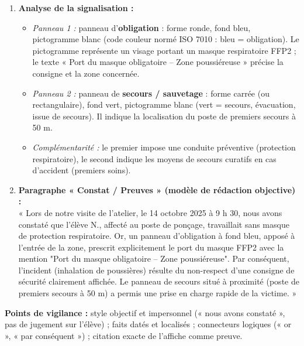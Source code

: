 \documentclass[11pt]{article}
\begin{document}
\begin{corrige}
\begin{enumerate}
    \item \textbf{Analyse de la signalisation :}
    \begin{itemize}
        \item \emph{Panneau 1 :} panneau d'\textbf{obligation} : forme ronde, fond bleu, pictogramme blanc (code couleur normé ISO 7010 : bleu = obligation). Le pictogramme représente un visage portant un masque respiratoire FFP2 ; le texte « Port du masque obligatoire – Zone poussiéreuse » précise la consigne et la zone concernée.
        \item \emph{Panneau 2 :} panneau de \textbf{secours / sauvetage} : forme carrée (ou rectangulaire), fond vert, pictogramme blanc (vert = secours, évacuation, issue de secours). Il indique la localisation du poste de premiers secours à 50 m.
        \item \emph{Complémentarité :} le premier impose une conduite préventive (protection respiratoire), le second indique les moyens de secours curatifs en cas d'accident (premiers soins).
    \end{itemize}
    \item \textbf{Paragraphe « Constat / Preuves » (modèle de rédaction objective) :}\\
    « Lors de notre visite de l'atelier, le 14 octobre 2025 à 9 h 30, nous avons constaté que l'élève N., affecté au poste de ponçage, travaillait sans masque de protection respiratoire. Or, un panneau d'obligation à fond bleu, apposé à l'entrée de la zone, prescrit explicitement le port du masque FFP2 avec la mention "Port du masque obligatoire – Zone poussiéreuse". Par conséquent, l'incident (inhalation de poussières) résulte du non-respect d'une consigne de sécurité clairement affichée. Le panneau de secours situé à proximité (poste de premiers secours à 50 m) a permis une prise en charge rapide de la victime. »
\end{enumerate}
\textbf{Points de vigilance :} style objectif et impersonnel (« nous avons constaté », pas de jugement sur l'élève) ; faits datés et localisés ; connecteurs logiques (« or », « par conséquent ») ; citation exacte de l'affiche comme preuve.
\end{corrige}
\end{document}
